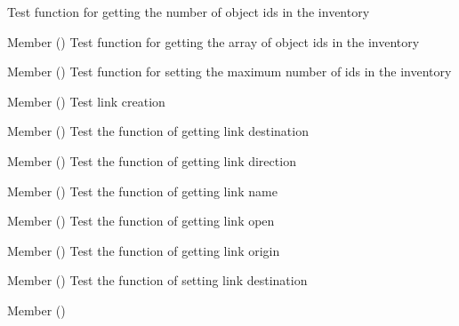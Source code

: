 \begin{DoxyRefList}
%
Test function for getting the number of object ids in the inventory  
\item[Member \doxylink{inventory__test_8h_ab6bbf8a9256793fdfe6e033b6d72b73e}{test2\+\_\+inventory\+\_\+get\+\_\+obj\+\_\+ids} ()]\label{test__test000044}%
%
Test function for getting the array of object ids in the inventory  
\item[Member \doxylink{inventory__test_8h_a64fb028724693b382de7a1d9d61604e1}{test2\+\_\+inventory\+\_\+set\+\_\+max\+\_\+objs} ()]\label{test__test000038}%
%
Test function for setting the maximum number of ids in the inventory  
\item[Member \doxylink{link__test_8h_a24b5463da176c3e578b0a0fa8bb1f9f0}{test2\+\_\+link\+\_\+create} ()]\label{test__test000046}%
%
Test link creation  
\item[Member \doxylink{link__test_8h_a8db6596d19305a9814a963a81d0d32d9}{test2\+\_\+link\+\_\+get\+\_\+destination} ()]\label{test__test000056}%
%
Test the function of getting link destination  
\item[Member \doxylink{link__test_8h_a63dbcd55ed0913dea30eba35884b5558}{test2\+\_\+link\+\_\+get\+\_\+direction} ()]\label{test__test000060}%
%
Test the function of getting link direction  
\item[Member \doxylink{link__test_8h_a4efc6cfcdc210e2803f9d285734c571e}{test2\+\_\+link\+\_\+get\+\_\+name} ()]\label{test__test000048}%
%
Test the function of getting link name  
\item[Member \doxylink{link__test_8h_ae7fd2d7b8e2bc167b00fe8d42c065932}{test2\+\_\+link\+\_\+get\+\_\+open} ()]\label{test__test000064}%
%
Test the function of getting link open  
\item[Member \doxylink{link__test_8h_a046f49dd5d1c36d2f385ccbc9a540e85}{test2\+\_\+link\+\_\+get\+\_\+origin} ()]\label{test__test000052}%
%
Test the function of getting link origin  
\item[Member \doxylink{link__test_8h_aaac8ca89513bad0aeca7074d589cd755}{test2\+\_\+link\+\_\+set\+\_\+destination} ()]\label{test__test000058}%
%
Test the function of setting link destination  
\item[Member \doxylink{link__test_8h_a9290046ce1c540c50cc3b7de92291fe3}{test2\+\_\+link\+\_\+set\+\_\+direction} ()]\label{test__test000062}%

\end{DoxyRefList}
